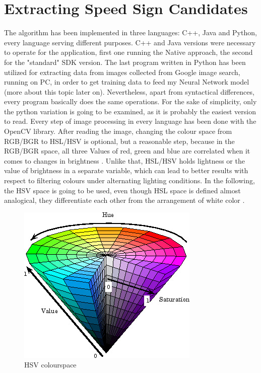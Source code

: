 \section{Extracting Speed Sign Candidates}\label{extraction}
The algorithm has been implemented in three languages: C++, Java and Python, every language serving different purposes. C++ and Java versions were necessary to operate for the application, first one running the Native approach, the second for the "standard" SDK version. The last program written in Python has been utilized for extracting data from images collected from Google image search, running on PC, in order to get training data to feed my Neural Network model (more about this topic later on). Nevertheless, apart from syntactical differences, every program basically does the same operations. For the sake of simplicity, only the python variation is going to be examined, as it is probably the easiest version to read. Every step of image processing in every language has been done with the OpenCV library. \newline
After reading the image, changing the colour space from RGB/BGR to HSL/HSV is optional, but a reasonable step, because in the RGB/BGR space, all three Values of red, green and blue are correlated when it comes to changes in brightness \cite{imagesegmentation}. Unlike that, HSL/HSV holds lightness or the value of brightness in a separate variable, which can lead to better results with respect to filtering colours under alternating lighting conditions. In the following, the HSV space is going to be used, even though HSL space is defined almost analogical, they differentiate each other from the arrangement of white color \cite{zynq}. \newline

\begin{figure}[H]
	\centering
	\includegraphics[width=\linewidth]{images/hsv.jpg}
	\caption{HSV colourspace \cite{hsv}}\label{fig:hsv}
	\endminipage\hfill
\end{figure}


